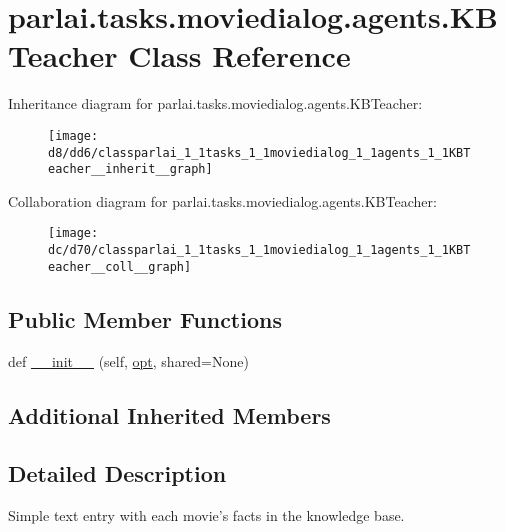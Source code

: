 \hypertarget{classparlai_1_1tasks_1_1moviedialog_1_1agents_1_1KBTeacher}{}\section{parlai.\+tasks.\+moviedialog.\+agents.\+K\+B\+Teacher Class Reference}
\label{classparlai_1_1tasks_1_1moviedialog_1_1agents_1_1KBTeacher}


Inheritance diagram for parlai.\+tasks.\+moviedialog.\+agents.\+K\+B\+Teacher\+:
\nopagebreak
\begin{figure}[H]
\begin{center}
\leavevmode
\texttt{[image: d8/dd6/classparlai\_1\_1tasks\_1\_1moviedialog\_1\_1agents\_1\_1KBTeacher\_\_inherit\_\_graph]}
\end{center}
\end{figure}


Collaboration diagram for parlai.\+tasks.\+moviedialog.\+agents.\+K\+B\+Teacher\+:
\nopagebreak
\begin{figure}[H]
\begin{center}
\leavevmode
\texttt{[image: dc/d70/classparlai\_1\_1tasks\_1\_1moviedialog\_1\_1agents\_1\_1KBTeacher\_\_coll\_\_graph]}
\end{center}
\end{figure}
\subsection*{Public Member Functions}
\begin{DoxyCompactItemize}
\item 
def \hyperlink{classparlai_1_1tasks_1_1moviedialog_1_1agents_1_1KBTeacher_a3b8e113d7035a814bf991562b2e2b799}{\+\_\+\+\_\+init\+\_\+\+\_\+} (self, \hyperlink{classparlai_1_1core_1_1teachers_1_1FbDialogTeacher_af7a9ec497b9cd0292d7b8fa220da7c28}{opt}, shared=None)
\end{DoxyCompactItemize}
\subsection*{Additional Inherited Members}


\subsection{Detailed Description}
\begin{DoxyVerb}Simple text entry with each movie's facts in the knowledge base.
\end{DoxyVerb}
 

